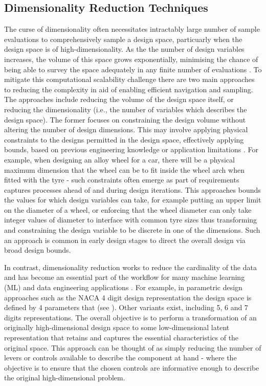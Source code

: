 \documentclass{article}
\begin{document}
\subsection{Dimensionality Reduction Techniques}
The curse of dimensionality often necessitates intractably large number of sample evaluations to comprehensively sample a design space, particuarly when the design space is of high-dimensionality. As the the number of design variables increases, the volume of this space grows exponentially, minimising the chance of being able to survey the space adequately in any finite number of evaluations \citep{Serani2024}. To mitigate this computational scalability challenge there are two main approaches to reducing the complexity in aid of enabling efficient navigation and sampling. The approaches include reducing the volume of the design space itself, or reducing the dimensionality (i.e., the number of variables which describes the design space). The former focuses on constraining the design volume without altering the number of design dimensions. This may involve applying physical constraints to the designs permitted in the design space, effectively applying bounds, based on previous engineering knowledge or application limitations \citep{Serani2024}. For example, when designing an alloy wheel for a car, there will be a physical maximum dimension that the wheel can be to fit inside the wheel arch when fitted with the tyre - such constraints often emerge as part of requirements captures processes ahead of and during design iterations. This approaches bounds the values for which design variables can take, for example putting an upper limit on the diameter of a wheel, or enforcing that the wheel diameter can only take integer values of diameter to interface with common tyre sizes thus transforming and constraining the design variable to be discrete in one of the dimensions. Such an approach is common in early design stages to direct the overall design via broad design bounds.

In contrast, dimensionality reduction works to reduce the cardinality of the data and has become an essential part of the workflow for many machine learning (ML) and data engineering applications \citep{Mendez2022}. For example, in parametric design approaches such as the NACA 4 digit design representation the design space is defined by 4 parameters that (see \cite{Jacobs1933}). Other variants exist, including 5, 6 and 7 digits representations. The overall objective is to perform a transformation of an originally high-dimensional design space to some low-dimensional latent representation that retains and captures the essential characteristics of the original space. This approach can be thought of as simply reducing the number of levers or controls available to describe the component at hand - where the objective is to ensure that the chosen controls are informative enough to describe the original high-dimensional problem. 
\end{document}
